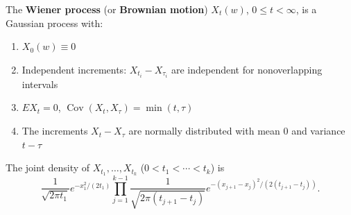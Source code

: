 The \textbf{Wiener process} (or \textbf{Brownian motion}) $X_t(w)$, $0 \leq t < \infty$, is a Gaussian process with:
\begin{enumerate}
\item $X_0(w) \equiv 0$
\item Independent increments: $X_{t_i} - X_{\tau_i}$ are independent for nonoverlapping intervals
\item $E X_t = 0$, $\operatorname{Cov}(X_t, X_\tau) = \min(t, \tau)$
\item The increments $X_t - X_\tau$ are normally distributed with mean 0 and variance $t - \tau$
\end{enumerate}

The joint density of $X_{t_1}, \ldots, X_{t_k}$ ($0 < t_1 < \cdots < t_k$) is
$$\frac{1}{\sqrt{2\pi t_1}} e^{-x_1^2/(2t_1)} \prod_{j=1}^{k-1} \frac{1}{\sqrt{2\pi(t_{j+1} - t_j)}} e^{-(x_{j+1} - x_j)^2/(2(t_{j+1} - t_j))}.$$
